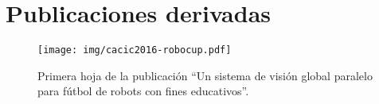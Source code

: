 
\appendix
\clearpage
\addappheadtotoc
\appendixpage

\chapter{Publicaciones derivadas}

\begin{figure}[!htb]

	\centering
	\texttt{[image: img/cacic2016-robocup.pdf]}
	\caption*{Primera hoja de la publicación ``Un sistema de visión global
	paralelo para fútbol de robots con fines educativos''.}

\end{figure}
